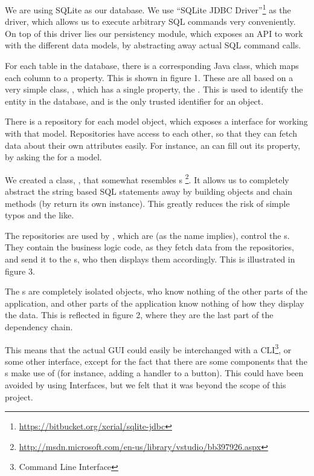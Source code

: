 We are using SQLite as our database. We use ``SQLite JDBC Driver''\footnote{\url{https://bitbucket.org/xerial/sqlite-jdbc}} as the driver, which allows us to execute arbitrary SQL commands very conveniently. On top of this driver lies our persistency module, which exposes an API to work with the different data models, by abstracting away actual SQL command calls.

For each table in the database, there is a corresponding Java class, which maps each column to a property. This is shown in figure 1. These are all based on a very simple class, , which has a single property, the . This is used to identify the entity in the database, and is the only trusted identifier for an object. 

There is a repository for each model object, which exposes a  interface for working with that model. Repositories have access to each other, so that they can fetch data about their own attributes easily. For instance, an  can fill out its  property, by asking the  for a  model.

We created a class, , that somewhat resembles s \footnote{\url{http://msdn.microsoft.com/en-us/library/vstudio/bb397926.aspx}}. It allows us to completely abstract the string based SQL statements away by building  objects and chain methods (by return its own instance). This greatly reduces the risk of simple typos and the like.

The repositories are used by , which are (as the name implies), control the s. They contain the business logic code, as they fetch data from the repositories, and send it to the s, who then displays them accordingly. This is illustrated in figure 3.

The s are completely isolated objects, who know nothing of the other parts of the application, and other parts of the application know nothing of how they display the data. This is reflected in figure 2, where they are the last part of the dependency chain.

This means that the actual GUI could easily be interchanged with a CLI\footnote{Command Line Interface}, or some other interface, except for the fact that there are some  components that the s make use of (for instance, adding a handler to a button). This could have been avoided by using Interfaces, but we felt that it was beyond the scope of this project.